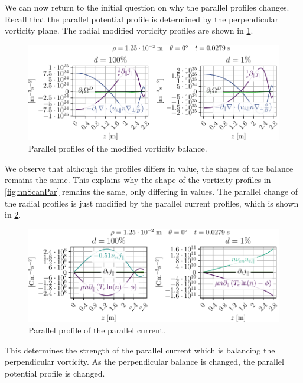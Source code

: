We can now return to the initial question on why the parallel profiles changes.
Recall that the parallel potential profile is determined by the perpendicular vorticity plane.
The radial modified vorticity profiles are shown in \cref{fig:nnScanVortDPar}.
%
\begin{figure}[htb]
    \centering
    \includegraphics{fig/results/neutral/vortDBalanceNnComparePar}
    \caption{Parallel profiles of the modified vorticity balance.}
    \label{fig:nnScanVortDPar}
\end{figure}
%
We observe that although the profiles differs in value, the shapes of the balance remains the same.
This explains why the shape of the vorticity profiles in \cref{fig:nnScanPar} remains the same, only differing in values.
The parallel change of the radial profiles is just modified by the parallel current profiles, which is shown in \cref{fig:nnScanJParPar}.
%
\begin{figure}[htb]
    \centering
    \includegraphics{fig/results/neutral/jParBalanceNnComparePar}
    \caption{Parallel profile of the parallel current.}
    \label{fig:nnScanJParPar}
\end{figure}
%
This determines the strength of the parallel current which is balancing the perpendicular vorticity.
As the perpendicular balance is changed, the parallel potential profile is changed.

